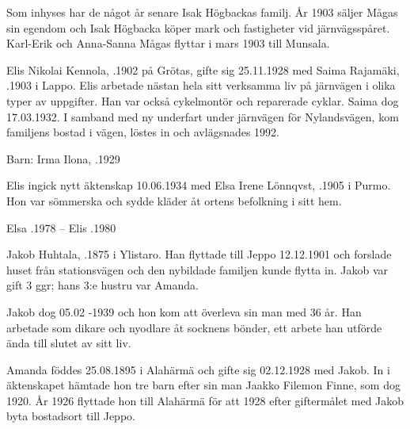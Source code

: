 Som inhyses har de något år senare Isak Högbackas familj. År 1903 säljer Mågas sin egendom och Isak Högbacka köper mark och fastigheter vid järnvägsspåret. Karl-Erik och Anna-Sanna Mågas flyttar i mars 1903 till Munsala.




Elis Nikolai Kennola, .1902 på Grötas, gifte sig 25.11.1928 med Saima Rajamäki, .1903 i Lappo. Elis arbetade nästan hela sitt verksamma liv på järnvägen i olika typer av uppgifter. Han var också cykelmontör och reparerade cyklar. Saima dog 17.03.1932. I samband med ny underfart under järnvägen för Nylandsvägen, kom familjens bostad i vägen, löstes in och avlägsnades 1992.

Barn: Irma Ilona, .1929



Elis ingick nytt äktenskap 10.06.1934 med Elsa Irene Lönnqvst, .1905 i Purmo. Hon var sömmerska och sydde kläder åt ortens
befolkning i sitt hem.
\begin{jhchildren}
  \item {}
  \item {}
\end{jhchildren}

Elsa .1978  --  Elis .1980





Jakob Huhtala, .1875 i Ylistaro. Han flyttade till Jeppo 12.12.1901 och forslade huset från stationsvägen och den nybildade familjen kunde flytta in. Jakob var gift 3 ggr; hans 3:e hustru var Amanda.

Jakob dog 05.02 -1939 och hon kom att överleva sin man med 36 år. Han arbetade som dikare och nyodlare åt socknens bönder, ett arbete han utförde ända till slutet av sitt liv.



Amanda föddes 25.08.1895 i Alahärmä och gifte sig 02.12.1928 med Jakob. In i äktenskapet hämtade hon tre barn efter sin man Jaakko Filemon Finne, som dog 1920. År 1926 flyttade hon till Alahärmä för att 1928 efter giftermålet med Jakob byta bostadsort till Jeppo.
\begin{jhchildren}
  \item {}
  \item {}
  \item {}
\end{jhchildren}

